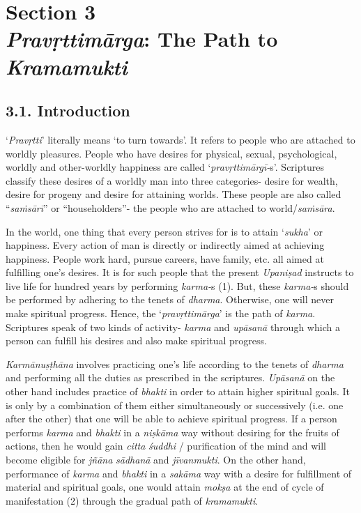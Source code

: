 \chapter{\textbf{Section 3\\ \emph{Pravṛttimārga}: The Path to \emph{Kramamukti}}}

\section*{3.1. Introduction}

`\emph{Pravṛtti}' literally means `to turn towards'. It refers to people who are attached to worldly pleasures. People who have desires for physical, sexual, psychological, worldly and other-worldly happiness are called `\emph{pravṛttimārgī-}s'. Scriptures classify these desires of a worldly man into three categories- desire for wealth, desire for progeny and desire for attaining worlds. These people are also called ``\emph{saṁsārī}'' or ``householders''- the people who are attached to world/\emph{saṁsāra}.

In the world, one thing that every person strives for is to attain `\emph{sukha}' or happiness. Every action of man is directly or indirectly aimed at achieving happiness. People work hard, pursue careers, have family, etc. all aimed at fulfilling one's desires. It is for such people that the present \emph{Upaniṣad} instructs to live life for hundred years by performing \emph{karma-}s (1). But, these \emph{karma-}s should be performed by adhering to the tenets of \emph{dharma}. Otherwise, one will never make spiritual progress. Hence, the `\emph{pravṛttimārga}' is the path of \emph{karma}. Scriptures speak of two kinds of activity- \emph{karma} and \emph{upāsanā} through which a person can fulfill his desires and also make spiritual progress.

\emph{Karmānuṣṭhāna} involves practicing one's life according to the tenets of \emph{dharma} and performing all the duties as prescribed in the scriptures. \emph{Upāsanā} on the other hand includes practice of \emph{bhakti} in order to attain higher spiritual goals. It is only by a combination of them either simultaneously or successively (i.e. one after the other) that one will be able to achieve spiritual progress. If a person performs \emph{karma} and \emph{bhakti} in a \emph{niṣkāma} way without desiring for the fruits of actions, then he would gain \emph{citta} \emph{śuddhi} / purification of the mind and will become eligible for \emph{jñāna} \emph{sādhanā} and \emph{jīvanmukti}. On the other hand, performance of \emph{karma} and \emph{bhakti} in a \emph{sakāma} way with a desire for fulfillment of material and spiritual goals, one would attain \emph{mokṣa} at the end of cycle of manifestation (2) through the gradual path of \emph{kramamukti}.

